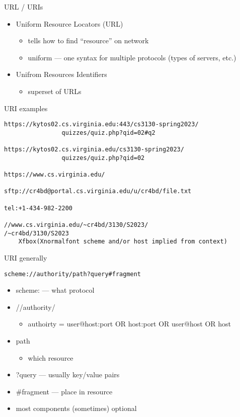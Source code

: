 \begin{frame}{URL / URIs}
\begin{itemize}
\item Uniform Resource Locators (URL)
    \begin{itemize}
    \item tells how to find ``resource'' on network
    \item uniform --- one syntax for multiple protocols (types of servers, etc.)
    \end{itemize}
\item Unifrom Resources Identifiers
    \begin{itemize}
    \item superset of URLs
    \end{itemize}
\end{itemize}
\end{frame}

\begin{frame}[fragile]{URI examples}
\begin{Verbatim}[fontsize=\small,commandchars=X()]
https://kytos02.cs.virginia.edu:443/cs3130-spring2023/
                quizzes/quiz.php?qid=02#q2

https://kytos02.cs.virginia.edu/cs3130-spring2023/
                quizzes/quiz.php?qid=02

https://www.cs.virginia.edu/

sftp://cr4bd@portal.cs.virginia.edu/u/cr4bd/file.txt

tel:+1-434-982-2200

//www.cs.virginia.edu/~cr4bd/3130/S2023/
/~cr4bd/3130/S2023
    Xfbox(Xnormalfont scheme and/or host implied from context)
\end{Verbatim}
\end{frame}


\begin{frame}[fragile]{URI generally}
\begin{Verbatim}
scheme://authority/path?query#fragment
\end{Verbatim}
\begin{itemize}
\item scheme: --- what protocol
\item //authority/
    \begin{itemize}
    \item authoirty = user@host:port OR host:port OR user@host OR host
    \end{itemize}
\item path
    \begin{itemize}
    \item which resource
    \end{itemize}
\item ?query --- usually key/value pairs 
\item \#fragment --- place in resource
\vspace{.5cm}
\item most components (sometimes) optional
\end{itemize}
\end{frame}
